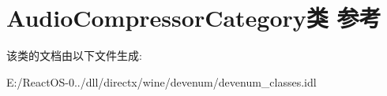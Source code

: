 \hypertarget{class_audio_compressor_category}{}\section{Audio\+Compressor\+Category类 参考}
\label{class_audio_compressor_category}


该类的文档由以下文件生成\+:\begin{DoxyCompactItemize}
\item 
E\+:/\+React\+O\+S-\/0../dll/directx/wine/devenum/devenum\+\_\+classes.\+idl\end{DoxyCompactItemize}
